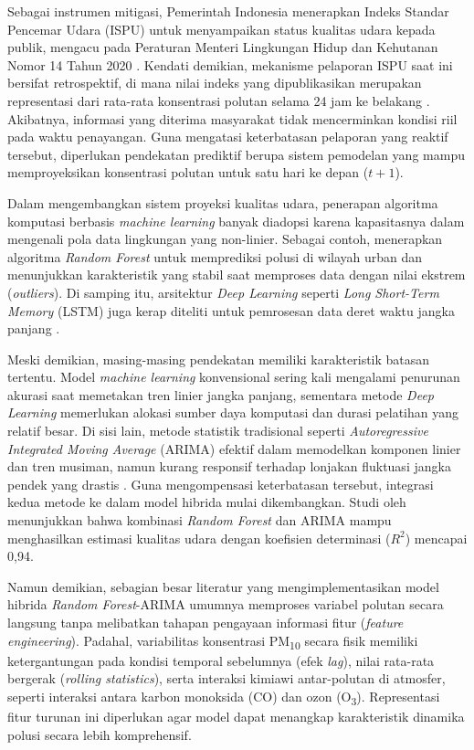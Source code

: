 Sebagai instrumen mitigasi, Pemerintah Indonesia menerapkan Indeks Standar Pencemar Udara (ISPU) untuk menyampaikan status kualitas udara kepada publik, mengacu pada Peraturan Menteri Lingkungan Hidup dan Kehutanan Nomor 14 Tahun 2020 \autocite{permenlhk2020ispu, chaniago2020ispu}. Kendati demikian, mekanisme pelaporan ISPU saat ini bersifat retrospektif, di mana nilai indeks yang dipublikasikan merupakan representasi dari rata-rata konsentrasi polutan selama 24 jam ke belakang \autocite{septiani2024combating}. Akibatnya, informasi yang diterima masyarakat tidak mencerminkan kondisi riil pada waktu penayangan. Guna mengatasi keterbatasan pelaporan yang reaktif tersebut, diperlukan pendekatan prediktif berupa sistem pemodelan yang mampu memproyeksikan konsentrasi polutan untuk satu hari ke depan ($t+1$).

Dalam mengembangkan sistem proyeksi kualitas udara, penerapan algoritma komputasi berbasis \textit{machine learning} banyak diadopsi karena kapasitasnya dalam mengenali pola data lingkungan yang non-linier. Sebagai contoh, \textcite{alarsy2025pm25} menerapkan algoritma \textit{Random Forest} untuk memprediksi polusi di wilayah urban dan menunjukkan karakteristik yang stabil saat memproses data dengan nilai ekstrem (\textit{outliers}). Di samping itu, arsitektur \textit{Deep Learning} seperti \textit{Long Short-Term Memory} (LSTM) juga kerap diteliti untuk pemrosesan data deret waktu jangka panjang \autocite{radjabaycolle2025improving}.

Meski demikian, masing-masing pendekatan memiliki karakteristik batasan tertentu. Model \textit{machine learning} konvensional sering kali mengalami penurunan akurasi saat memetakan tren linier jangka panjang, sementara metode \textit{Deep Learning} memerlukan alokasi sumber daya komputasi dan durasi pelatihan yang relatif besar. Di sisi lain, metode statistik tradisional seperti \textit{Autoregressive Integrated Moving Average} (ARIMA) efektif dalam memodelkan komponen linier dan tren musiman, namun kurang responsif terhadap lonjakan fluktuasi jangka pendek yang drastis \autocite{vasconcelos2025stationarity}. Guna mengompensasi keterbatasan tersebut, integrasi kedua metode ke dalam model hibrida mulai dikembangkan. Studi oleh \textcite{yenkikar2025explainable} menunjukkan bahwa kombinasi \textit{Random Forest} dan ARIMA mampu menghasilkan estimasi kualitas udara dengan koefisien determinasi ($R^2$) mencapai 0,94.

Namun demikian, sebagian besar literatur yang mengimplementasikan model hibrida \textit{Random Forest}-ARIMA \autocite{naz2024two, chen2025hybrid, yunis2024hybridization} umumnya memproses variabel polutan secara langsung tanpa melibatkan tahapan pengayaan informasi fitur (\textit{feature engineering}). Padahal, variabilitas konsentrasi PM\textsubscript{10} secara fisik memiliki ketergantungan pada kondisi temporal sebelumnya (efek \textit{lag}), nilai rata-rata bergerak (\textit{rolling statistics}), serta interaksi kimiawi antar-polutan di atmosfer, seperti interaksi antara karbon monoksida (CO) dan ozon (O\textsubscript{3}). Representasi fitur turunan ini diperlukan agar model dapat menangkap karakteristik dinamika polusi secara lebih komprehensif.


